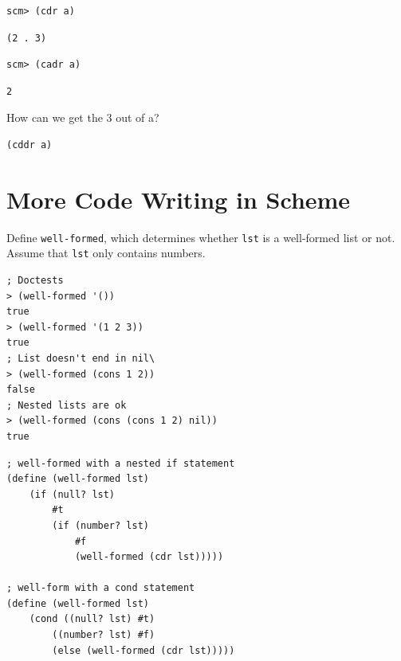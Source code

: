 \documentclass{exam}
\begin{document}
\begin{questions}
\begin{blocksection}
\begin{lstlisting}
scm> (cdr a)
\end{lstlisting}
\begin{solution}[.25in]
\begin{lstlisting}
(2 . 3)
\end{lstlisting}
\end{solution}

\begin{lstlisting}
scm> (cadr a)
\end{lstlisting}
\begin{solution}[.25in]
\begin{lstlisting}
2
\end{lstlisting}
\end{solution}

How can we get the 3 out of a?
\begin{solution}[.25in]
\begin{lstlisting}
(cddr a)
\end{lstlisting}
\end{solution}
\end{blocksection}

\section{More Code Writing in Scheme}

\begin{blocksection}
\question Define \texttt{well-formed}, which determines whether \texttt{lst} is a well-formed list or not. Assume that \texttt{lst} only contains numbers.

\begin{lstlisting}
; Doctests
> (well-formed '())
true
> (well-formed '(1 2 3))
true
; List doesn't end in nil\
> (well-formed (cons 1 2))
false
; Nested lists are ok
> (well-formed (cons (cons 1 2) nil))
true
\end{lstlisting}

\begin{solution}[0.75in]
\begin{lstlisting}
; well-formed with a nested if statement
(define (well-formed lst) 
    (if (null? lst) 
        #t 
        (if (number? lst)
            #f 
            (well-formed (cdr lst)))))

; well-form with a cond statement
(define (well-formed lst)
    (cond ((null? lst) #t)
        ((number? lst) #f)
        (else (well-formed (cdr lst)))))
\end{lstlisting}
\end{solution}
\end{blocksection}


\end{questions}
\end{document}
